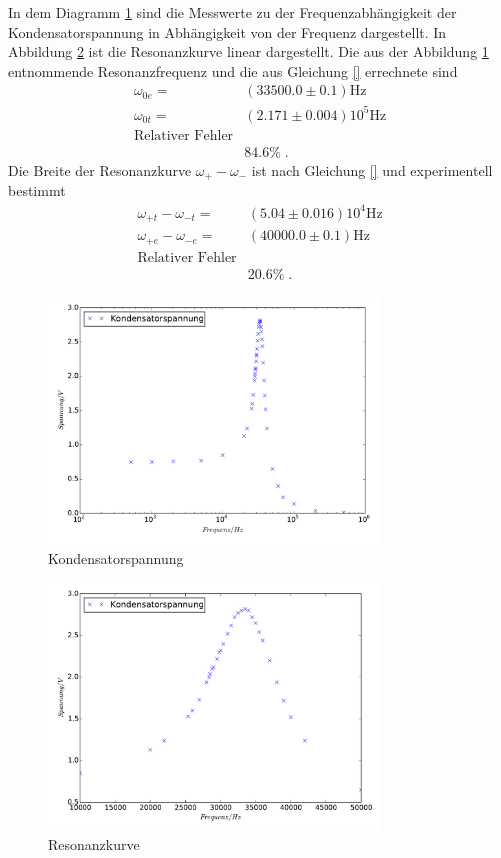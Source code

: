 In dem Diagramm \ref{fig:Kondensatorspannung} sind die
Messwerte zu der Frequenzabhängigkeit der Kondensatorspannung in Abhängigkeit
von der Frequenz dargestellt. In Abbildung \ref{fig:Resonanzkurve} ist die
Resonanzkurve linear dargestellt. Die aus der Abbildung \ref{fig:Kondensatorspannung}
entnommende Resonanzfrequenz und die aus Gleichung
\eqref{} errechnete sind
\begin{align*}
\omega_{0e}=&(33500.0\pm0.1)\si{\hertz}\\
\omega_{0t}=&(2.171\pm0.004)10^5\si{\hertz}\\
\text{Relativer Fehler}\\
 &84.6\%\;.
\end{align*}
 Die Breite der
Resonanzkurve $\omega_+-\omega_- $ ist nach Gleichung \eqref{}
 und experimentell bestimmt
\begin{align*}
 \omega_{+t}-\omega_{-t}=&(5.04\pm0.016)10^4\si{\hertz}\\
 \omega_{+e}-\omega_{-e}=&(40000.0\pm0.1)\si{\hertz}\\
 \text{Relativer Fehler}\\
  &20.6\%\;.
\end{align*}
\begin{figure}
  \centering
  \includegraphics[width=0.78\textwidth]{Kondensatorspannung.pdf}
  \caption{Kondensatorspannung}
  \label{fig:Kondensatorspannung}
\end{figure}
\begin{figure}
  \centering
  \includegraphics[width=0.78\textwidth]{Resonanzkurve.pdf}
  \caption{Resonanzkurve}
  \label{fig:Resonanzkurve}
\end{figure}
